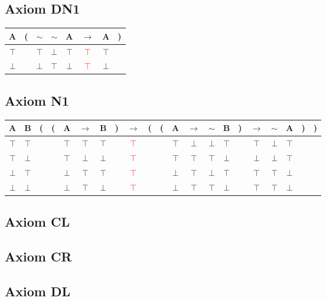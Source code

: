\documentclass{article}
\begin{document}
\subsection{Axiom DN1}
\begin{tabular}{@{ }c | c@{}@{ }c@{ }@{ }c@{ }@{ }c@{ }@{ }c@{ }@{ }c@{ }@{}c@{ }}
A & ( & $\sim$ & $\sim$ & A & $\rightarrow$ & A & )\\
\hline 
$\top$ &  & $\top$ & $\bot$ & $\top$ & \textcolor{red}{$\top$} & $\top$ & \\
$\bot$ &  & $\bot$ & $\top$ & $\bot$ & \textcolor{red}{$\top$} & $\bot$ & \\
\end{tabular}

\subsection{Axiom N1}
\begin{tabular}{@{ }c@{ }@{ }c | c@{}@{}c@{}@{ }c@{ }@{ }c@{ }@{ }c@{ }@{}c@{}@{ }c@{ }@{}c@{}@{}c@{}@{ }c@{ }@{ }c@{ }@{ }c@{ }@{ }c@{ }@{}c@{}@{ }c@{ }@{ }c@{ }@{ }c@{ }@{}c@{}@{}c@{ }}
A & B & ( & ( & A & $\rightarrow$ & B & ) & $\rightarrow$ & ( & ( & A & $\rightarrow$ & $\sim$ & B & ) & $\rightarrow$ & $\sim$ & A & ) & )\\
\hline 
$\top$ & $\top$ &  &  & $\top$ & $\top$ & $\top$ &  & \textcolor{red}{$\top$} &  &  & $\top$ & $\bot$ & $\bot$ & $\top$ &  & $\top$ & $\bot$ & $\top$ &  & \\
$\top$ & $\bot$ &  &  & $\top$ & $\bot$ & $\bot$ &  & \textcolor{red}{$\top$} &  &  & $\top$ & $\top$ & $\top$ & $\bot$ &  & $\bot$ & $\bot$ & $\top$ &  & \\
$\bot$ & $\top$ &  &  & $\bot$ & $\top$ & $\top$ &  & \textcolor{red}{$\top$} &  &  & $\bot$ & $\top$ & $\bot$ & $\top$ &  & $\top$ & $\top$ & $\bot$ &  & \\
$\bot$ & $\bot$ &  &  & $\bot$ & $\top$ & $\bot$ &  & \textcolor{red}{$\top$} &  &  & $\bot$ & $\top$ & $\top$ & $\bot$ &  & $\top$ & $\top$ & $\bot$ &  & \\
\end{tabular}
\subsection{Axiom CL}

\subsection{Axiom CR}
\subsection{Axiom DL}
\end{document}
